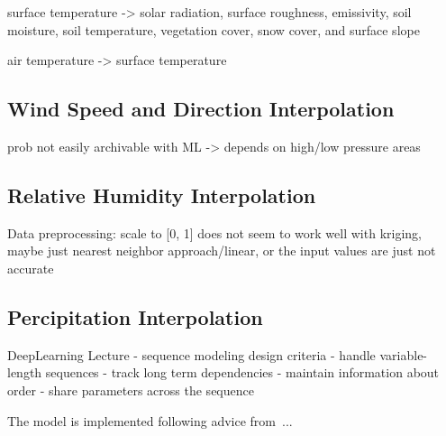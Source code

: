 surface temperature -> solar radiation, surface roughness, emissivity, soil moisture, soil temperature, vegetation cover, snow cover, and surface slope

air temperature -> surface temperature

\subsection{Wind Speed and Direction Interpolation}
prob not easily archivable with ML -> depends on high/low pressure areas

\subsection{Relative Humidity Interpolation}
Data preprocessing: scale to [0, 1]
does not seem to work well with kriging, maybe just nearest neighbor approach/linear, or the input values are just not accurate

\subsection{Percipitation Interpolation}



DeepLearning Lecture
- sequence modeling design criteria
    - handle variable-length sequences
    - track long term dependencies
    - maintain information about order
    - share parameters across the sequence

The model is implemented following advice from~\cite{rey2023geographic}...
